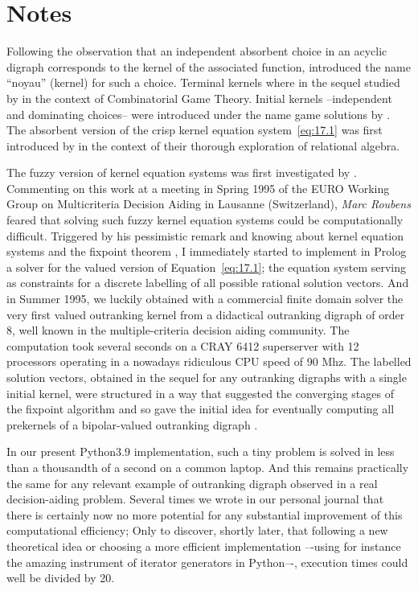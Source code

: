 \section*{Notes}

Following the observation that an independent absorbent choice in an acyclic digraph corresponds to the kernel of the associated \Grundy function, \citet{RIG-1948} introduced the name ``noyau'' (kernel) for such a choice. Terminal kernels where in the sequel studied by \citet{BER-1958} in the context of Combinatorial Game Theory. Initial kernels --independent and dominating choices-- were introduced under the name game solutions by \citet{NEU-1944}. The absorbent version of the crisp kernel equation system~\vref{eq:17.1} was first introduced by \citet*{SCH-1985} in the context of their thorough exploration of relational algebra.

The fuzzy version of kernel equation systems was first investigated by \citet{KIT-1993}. Commenting on this work at a meeting in Spring 1995 of the EURO Working Group on Multicriteria Decision Aiding in Lausanne (Switzerland), \emph{Marc Roubens} feared that solving such fuzzy kernel equation systems could be computationally difficult. Triggered by his pessimistic remark and knowing about kernel equation systems and the \Neumann fixpoint theorem \citep{NEU-1944,SCH-1985}, I immediately started to implement in Prolog a solver for the valued version of Equation~\vref{eq:17.1}; the equation system serving as constraints for a discrete labelling of all possible rational solution vectors. And in Summer 1995, we luckily obtained with a commercial finite domain solver the very first valued outranking kernel from a didactical outranking digraph of order 8, well known in the multiple-criteria decision aiding community. The computation took several seconds on a CRAY 6412 superserver with 12 processors operating in a nowadays ridiculous CPU speed of 90 Mhz. The labelled solution vectors, obtained in the sequel for any outranking digraphs with a single initial kernel, were structured in a way that suggested the converging stages of the \Neumann fixpoint algorithm and so gave the initial idea for eventually computing all prekernels of a bipolar-valued outranking digraph \citep*{BIS-1996,BIS-1997,BIS-2004d}. 

In our present Python3.9 implementation, such a tiny problem is solved in less than a thousandth of a second on a common laptop. And this remains practically the same for any relevant example of outranking digraph observed in a real decision-aiding problem. Several times we wrote in our personal journal that there is certainly now no more potential for any substantial improvement of this computational efficiency; Only to discover, shortly later, that following a new theoretical idea or choosing a more efficient implementation –-using for instance the amazing instrument of iterator generators in Python–-, execution times could well be divided by 20.

